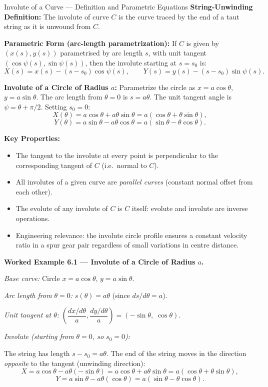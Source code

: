 \documentclass[12pt,a4paper]{article}
\begin{document}
\begin{infobox}{Involute of a Curve --- Definition and Parametric Equations}
\textbf{String-Unwinding Definition:} The involute of curve $C$ is the curve traced by the end of a taut string as it is unwound from $C$.

\textbf{Parametric Form (arc-length parametrization):}
If $C$ is given by $(x(s), y(s))$ parametrised by arc length $s$, with unit tangent $(\cos\psi(s), \sin\psi(s))$, then the involute starting at $s = s_0$ is:
\[
  X(s) = x(s) - (s - s_0)\cos\psi(s), \qquad Y(s) = y(s) - (s-s_0)\sin\psi(s).
\]

\textbf{Involute of a Circle of Radius $a$:}
Parametrize the circle as $x = a\cos\theta$, $y = a\sin\theta$. The arc length from $\theta=0$ is $s = a\theta$. The unit tangent angle is $\psi = \theta + \pi/2$. Setting $s_0 = 0$:
\[
  X(\theta) = a\cos\theta + a\theta\sin\theta = a(\cos\theta + \theta\sin\theta),
\]
\[
  Y(\theta) = a\sin\theta - a\theta\cos\theta = a(\sin\theta - \theta\cos\theta).
\]

\textbf{Key Properties:}
\begin{itemize}[nosep]
  \item The tangent to the involute at every point is perpendicular to the corresponding tangent of $C$ (i.e.\ normal to $C$).
  \item All involutes of a given curve are \emph{parallel curves} (constant normal offset from each other).
  \item The evolute of any involute of $C$ is $C$ itself: evolute and involute are inverse operations.
  \item Engineering relevance: the involute circle profile ensures a constant velocity ratio in a spur gear pair regardless of small variations in centre distance.
\end{itemize}
\end{infobox}

\textbf{Worked Example 6.1 --- Involute of a Circle of Radius $a$.}

\textit{Base curve:} Circle $x = a\cos\theta$, $y = a\sin\theta$.

\textit{Arc length from $\theta = 0$:} $s(\theta) = a\theta$ (since $ds/d\theta = a$).

\textit{Unit tangent at $\theta$:} $\left(\dfrac{dx/d\theta}{a}, \dfrac{dy/d\theta}{a}\right) = (-\sin\theta,\; \cos\theta)$.

\textit{Involute (starting from $\theta=0$, so $s_0 = 0$):}

The string has length $s - s_0 = a\theta$. The end of the string moves in the direction \emph{opposite} to the tangent (unwinding direction):
\[
  X = a\cos\theta - a\theta(-\sin\theta) = a\cos\theta + a\theta\sin\theta = a(\cos\theta + \theta\sin\theta),
\]
\[
  Y = a\sin\theta - a\theta(\cos\theta) = a(\sin\theta - \theta\cos\theta).
\]
\end{document}
